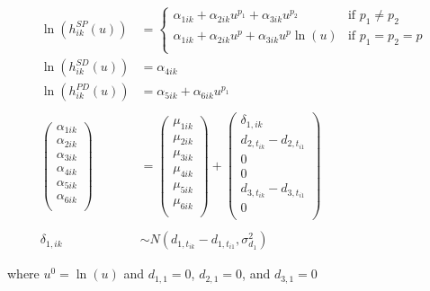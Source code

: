 \documentclass[11pt,final,fleqn]{article}\usepackage[]{graphicx}\usepackage[]{color}
\theoremstyle{plain}
\begin{document}
{\begin{equation}\label{eqn:multistate-nma}
\begin{aligned} 
\ln\left(h_{ik}^{SP}(u)\right) &= 
\begin{cases}
\alpha_{1ik} + \alpha_{2ik}u^{p_1} + \alpha_{3ik}u^{p_2} & \text{if } p_1 \neq p_2 \\ 
\alpha_{1ik} + \alpha_{2ik}u^{p} + \alpha_{3ik}u^{p}\ln(u) & \text{if } p_1 = p_2 = p \\ 
\end{cases}\\ 
\ln\left(h_{ik}^{SD}(u)\right) &=
\alpha_{4ik}\\
\ln\left(h_{ik}^{PD}(u)\right) &=
\alpha_{5ik} + \alpha_{6ik}u^{p_1}\\ 
\\
\begin{pmatrix}
\alpha_{1ik} \\
\alpha_{2ik} \\
\alpha_{3ik} \\
\alpha_{4ik} \\
\alpha_{5ik} \\
\alpha_{6ik} \\
\end{pmatrix}
&= 
\begin{pmatrix}
\mu_{1ik} \\
\mu_{2ik} \\
\mu_{3ik} \\
\mu_{4ik} \\
\mu_{5ik} \\
\mu_{6ik} \\
\end{pmatrix} 
+
\begin{pmatrix}
\delta_{1,ik} \\
d_{2, t_{ik}} - d_{2, t_{i1}}  \\
0 \\
0  \\
d_{3, t_{ik}} - d_{3, t_{i1}} \\
0 \\
\end{pmatrix} \\\\ 
\delta_{1,ik} &\sim N(d_{1, t_{ik}} - d_{1, t_{i1}}, \sigma_{d_{1}}^{2}) 
\end{aligned}
\end{equation}

where $u^0= \ln(u)$ and ${d_{1,1}}=0$, ${d_{2,1}}=0$, and ${d_{3,1}}=0$
\\

}
\end{document}

